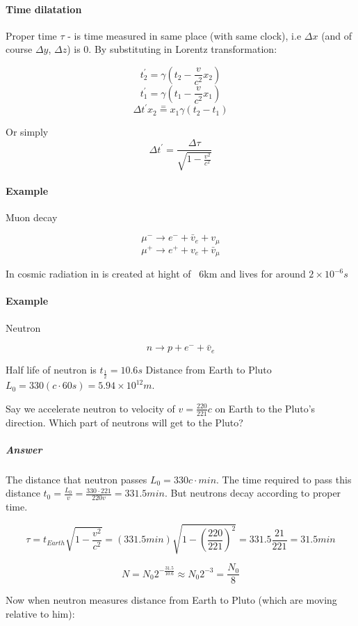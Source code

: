 \paragraph{Time dilatation}

Proper time $\tau$ - is time measured in same place (with same clock), i.e $\Delta x$ (and of course $\Delta y$, $\Delta z$) is 0. By substituting in Lorentz transformation:

$$t_2^\prime = \gamma \left( t_2 - \frac{v}{c^2}x_2 \right)$$
$$t_1^\prime = \gamma \left( t_1 - \frac{v}{c^2}x_1 \right)$$
$$\Delta t^\prime \stackrel{=}{x_2=x_1} \gamma \left( t_2-t_1 \right)$$

Or simply 
$$\Delta t^\prime = \frac{\Delta \tau}{\sqrt{1-\frac{v^2}{c^2}}}$$
	
\paragraph{Example} Muon decay

$$\mu^-  \to e^- + \bar{v}_e + v_\mu$$
$$\mu^+  \to e^+ + v_e + \bar{v}_\mu$$

In cosmic radiation in is created at hight of ~6km and lives for around $2\times 10^{-6}s$
\paragraph{Example} Neutron

$$n \to p + e^- + \bar{v}_e$$ 

Half life of neutron is $t_{\frac{1}{2}}  =10.6s$ Distance from Earth to Pluto $L_0 = 330 (c \cdot 60s) = 5.94 \times 10^{12} m$.

 Say we accelerate neutron to velocity of $v = \frac{220}{221}c$ on Earth to the Pluto's direction. Which part of neutrons will get to the Pluto?
 
 \subparagraph{Answer}
 
 The distance that neutron passes $L_0 = 330 c \cdot min$. The time required to pass this distance $t_0 = \frac{L_0}{v} = \frac{330 \cdot 221}{220v} = 331.5 min$. But neutrons decay according to proper time.
 
 $$\tau = t_{Earth} \sqrt{1 - \frac{v^2}{c^2}} = \left(331.5 min \right) \sqrt{1 - \left( \frac{220}{221}  \right)^2}  =331.5 \frac{21}{221} = 31.5 min$$
 
 $$N = N_0 2 ^ {-\frac{31.5}{10.6}} \approx N_0 2^{-3} = \frac{N_0}{8}$$ 
 
 Now when neutron measures distance from Earth to Pluto (which are moving relative to him):
 
